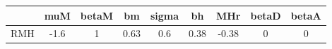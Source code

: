 \begin{tabular}{|c|c|c|c|c|c|c|c|c|}
\hline
& muM & betaM & bm & sigma & bh & MHr & betaD & betaA \\
\hline
RMH & -1.6 & 1 & 0.63 & 0.6 & 0.38 & -0.38 & 0 & 0 \\
\hline
\end{tabular}
